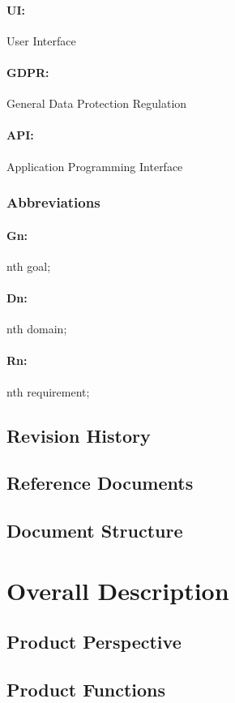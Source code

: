 \documentclass{article}
\begin{document}
\paragraph{UI:} User Interface
\paragraph{GDPR:} General Data Protection Regulation
\paragraph{API:} Application Programming Interface
\subsubsection{Abbreviations}
\paragraph{Gn:} nth goal;
\paragraph{Dn:} nth domain;
\paragraph{Rn:} nth requirement;
\subsection{Revision History}
\subsection{Reference Documents}
\subsection{Document Structure}

\newpage
\section{Overall Description}
\subsection{Product Perspective}
\subsection{Product Functions}
\end{document}
